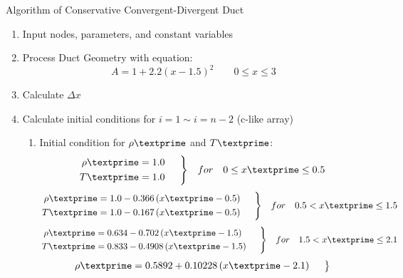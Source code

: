 \documentclass[12pt]{article}
\newenvironment{rcases}
	{\left.\begin{aligned}}
	{\end{aligned}\hspace{1.5em}\right\rbrace}
\begin{document}
{\huge \centering Algorithm of Conservative Convergent-Divergent Duct}

\begin{enumerate}
	\item Input nodes, parameters, and constant variables
	\item Process Duct Geometry with equation:
		\begin{equation}
			A = 1 + 2.2\left(x - 1.5\right)^{2}\hspace{2em}0\leq x \leq 3
		\end{equation}
	\item Calculate $\Delta x$
	\item Calculate initial conditions for $i = 1 \sim i = n - 2$ (c-like array)
	\begin{enumerate}
		\item Initial condition for $\rho\textprime$ and $T\textprime$:
			\begin{equation}
				\begin{rcases}
					\rho\textprime	&= 1.0 \\
					T\textprime	&= 1.0
				\end{rcases}
				\hspace{1em}for\hspace{1em}0\leq x\textprime \leq 0.5
			\end{equation}
			\begin{equation}
				\begin{rcases}
					\rho\textprime	&= 1.0 - 0.366\left(x\textprime - 0.5\right)\\
					T\textprime	&= 1.0 - 0.167\left(x\textprime - 0.5\right)
				\end{rcases}
				\hspace{1em}for\hspace{1em}0.5 < x\textprime \leq 1.5
			\end{equation}
			\begin{equation}
				\begin{rcases}
					\rho\textprime	&= 0.634 - 0.702\left(x\textprime - 1.5\right)\\
					T\textprime	&= 0.833 - 0.4908\left(x\textprime - 1.5\right)
				\end{rcases}
				\hspace{1em}for\hspace{1em}1.5 < x\textprime \leq 2.1
			\end{equation}
			\begin{equation}
				\begin{rcases}
					\rho\textprime	&= 0.5892 + 0.10228\left(x\textprime - 2.1\right)\\

\end{rcases}
\end{equation}
\end{enumerate}
\end{enumerate}
\end{document}
